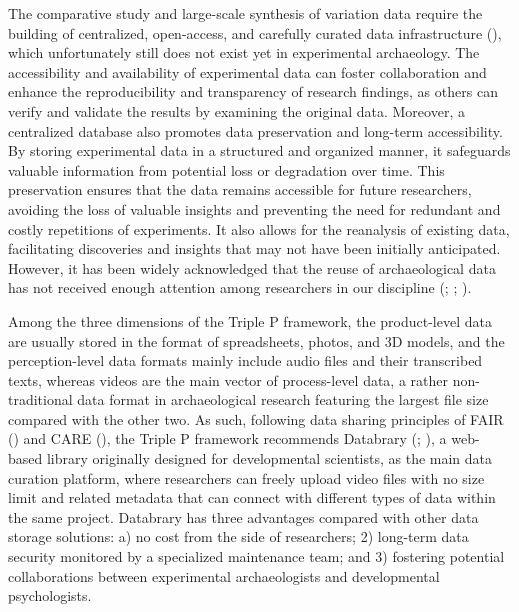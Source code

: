 \documentclass[
  11pt,
  letterpaper,
  DIV=11,
  numbers=noendperiod]{scrartcl}
\begin{document}
The comparative study and large-scale synthesis of variation data
require the building of centralized, open-access, and carefully curated
data infrastructure (), which unfortunately still does not exist yet in experimental
archaeology. The accessibility and availability of experimental data can
foster collaboration and enhance the reproducibility and transparency of
research findings, as others can verify and validate the results by
examining the original data. Moreover, a centralized database also
promotes data preservation and long-term accessibility. By storing
experimental data in a structured and organized manner, it safeguards
valuable information from potential loss or degradation over time. This
preservation ensures that the data remains accessible for future
researchers, avoiding the loss of valuable insights and preventing the
need for redundant and costly repetitions of experiments. It also allows
for the reanalysis of existing data, facilitating discoveries and
insights that may not have been initially anticipated. However, it has
been widely acknowledged that the reuse of archaeological data has not
received enough attention among researchers in our discipline
(;
;
).

Among the three dimensions of the Triple P framework, the product-level
data are usually stored in the format of spreadsheets, photos, and 3D
models, and the perception-level data formats mainly include audio files
and their transcribed texts, whereas videos are the main vector of
process-level data, a rather non-traditional data format in
archaeological research featuring the largest file size compared with
the other two. As such, following data sharing principles of FAIR
() and CARE
(), the Triple P
framework recommends Databrary (; ), a web-based
library originally designed for developmental scientists, as the main
data curation platform, where researchers can freely upload video files
with no size limit and related metadata that can connect with different
types of data within the same project. Databrary has three advantages
compared with other data storage solutions: a) no cost from the side of
researchers; 2) long-term data security monitored by a specialized
maintenance team; and 3) fostering potential collaborations between
experimental archaeologists and developmental psychologists.
\end{document}
